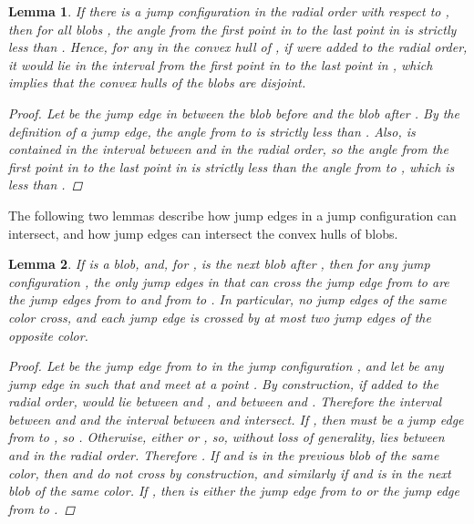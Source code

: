 \documentclass[12pt]{article}
\newtheorem{lemma}{Lemma}
\theoremstyle{definition}
\begin{document}
\begin{lemma}
  \label{lem:jump-config-blob-order}
  If there is a jump configuration  in the radial order with respect to , then for all blobs , the angle from the first point in  to the last point in  is strictly less than .
  Hence, for any  in the convex hull of , if  were added to the radial order, it would lie in the interval from the first point in  to the last point in , which implies that the convex hulls of the blobs are disjoint.

  \begin{proof}
    Let  be the jump edge in  between the blob before  and the blob after .
    By the definition of a jump edge, the angle from  to  is strictly less than .
    Also,  is contained in the interval between  and  in the radial order, so the angle from the first point in  to the last point in  is strictly less than the angle from  to , which is less than .
  \end{proof}
\end{lemma}


The following two lemmas describe how jump edges in a jump configuration can intersect, and how jump edges can intersect the convex hulls of blobs.

\begin{lemma}
  \label{lem:jump-config-crossing}
  If  is a blob, and, for ,  is the next blob after , then for any jump configuration , the only jump edges in  that can cross the jump edge from  to  are the jump edges from  to  and from  to .
  In particular, no jump edges of the same color cross, and each jump edge is crossed by at most two jump edges of the opposite color.

  \begin{proof}
    Let  be the jump edge from  to  in the jump configuration , and let  be any jump edge in  such that  and  meet at a point .
    By construction, if added to the radial order,  would lie between  and , and between  and .
    Therefore the interval  between  and  and the interval  between  and  intersect.
    If , then  must be a jump edge from  to , so .
    Otherwise, either  or , so, without loss of generality,  lies between  and  in the radial order.
    Therefore .
    If  and  is in the previous blob of the same color, then  and  do not cross by construction, and similarly if  and  is in the next blob of the same color.
    If , then  is either the jump edge from  to  or the jump edge from  to .
  \end{proof}
\end{lemma}
\end{document}
